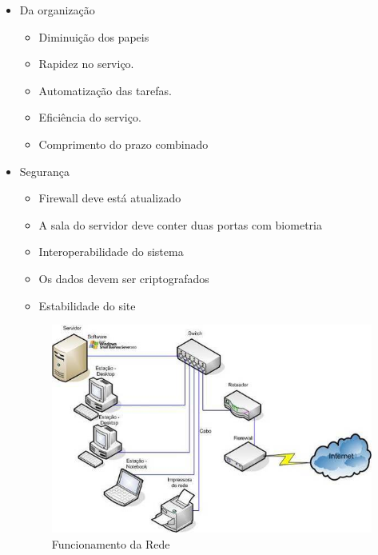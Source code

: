 \begin{itemize}
	 \item Da organização
	   \begin{itemize}
	   	    \item Diminuição dos papeis
	        \item Rapidez no serviço.
	    	\item Automatização das tarefas.
	    	\item Eficiência do serviço.
	    	\item Comprimento do prazo combinado
	   \end{itemize} 
	   
	 \item Segurança
	   \begin{itemize}
	   		\item	Firewall deve está atualizado 
	   		\item	A sala do servidor deve conter duas portas com biometria
	   		\item	Interoperabilidade do sistema
	   		\item	Os dados devem ser criptografados
	   		\item	Estabilidade do site
	   \end{itemize}
	   
	     \begin{figure}[H]
	      \centering
	       \includegraphics{rede}
	       \caption{Funcionamento da Rede}
	       \label{figRotulo}
               \end{figure}

	   
       \end{itemize}
